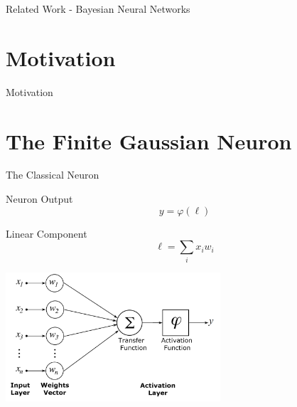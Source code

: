 \documentclass{beamer}
\begin{document}
\begin{frame}{Related Work - Bayesian Neural Networks}

\end{frame}

\section{Motivation}
\begin{frame}{Motivation}

\end{frame}


\section{The Finite Gaussian Neuron}

\begin{frame}{The Classical Neuron}
    \begin{block}{Neuron Output}
        $$y = \varphi(\ell)$$
    \end{block}
    \begin{block}{Linear Component}
        $$\ell=\sum_i x_i w_i$$
    \end{block}
    \begin{center}
        \includegraphics[width=0.6\textwidth]{images/artificial_neuron_model.png}
    \end{center}
\end{frame}
\end{document}
